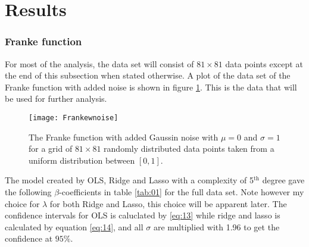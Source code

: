 \documentclass[uio,jmp,amsmath,amssymb,reprint,nofootinbib]{revtex4-1}
\numberwithin{equation}{section}
\begin{document}
\section{Results}\label{sec:Results}

\subsubsection{Franke function}

For most of the analysis, the data set will consist of \(81\times 81\) data points except at the end of this subsection when stated otherwise. A plot of the data set of the Franke function with added noise is shown in figure \ref{fig:Franke_w_noise}. This is the data that will be used for further analysis.

\begin{figure}[H]
    \centering
    \texttt{[image: Frankewnoise]}
    \caption{The Franke function with added Gaussin noise with \(\mu=0\) and \(\sigma=1\) for a grid of \(81\times 81\) randomly distributed data points taken from a uniform distribution between \([0,1]\).}
    \label{fig:Franke_w_noise}
\end{figure}

The model created by OLS, Ridge and Lasso with a complexity of 5\(^\text{th}\) degree gave the following \(\beta\)-coefficients in table \ref{tab:01} for the full data set. Note however my choice for \(\lambda\) for both Ridge and Lasso, this choice will be apparent later. The confidence intervals for OLS is caluclated by \ref{eq:13} while ridge and lasso is calculated by equation \ref{eq:14}, and all \(\sigma\) are multiplied with 1.96 to get the confidence at \(95\%\).
\end{document}
